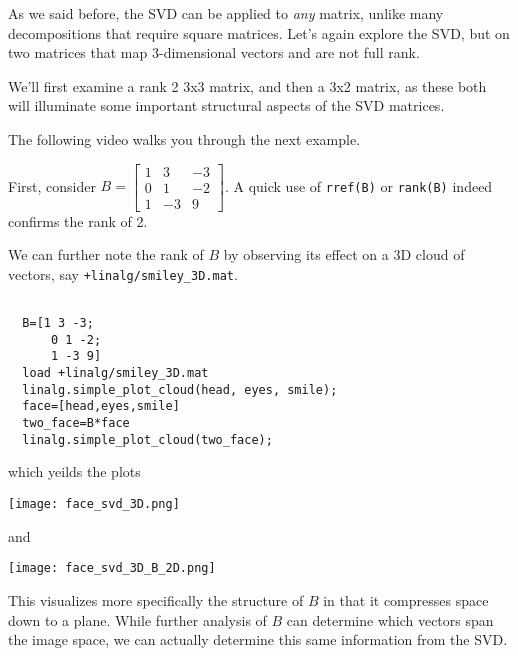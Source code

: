 \documentclass{ximera}
\begin{document}
As we said before, the SVD can be applied to \emph{any} matrix, unlike many decompositions that require square matrices. Let's again explore the SVD, but on two matrices that map $3$-dimensional vectors and are not full rank.

We'll first examine a rank 2 3x3 matrix, and then a 3x2 matrix, as these both will illuminate some important structural aspects of the SVD matrices. 

The following video walks you through the next example.

\begin{center}
\end{center}

First, consider $B=\begin{bmatrix}1&3&-3\\0&1&-2\\1&-3&9\end{bmatrix}$. A quick use of \texttt{rref(B)} or \texttt{rank(B)} indeed confirms the rank of 2. 

We can further note the rank of $B$ by observing its effect on a $3$D cloud of vectors, say \texttt{+linalg/smiley\_3D.mat}. 

\begin{verbatim}

  B=[1 3 -3;
      0 1 -2;
      1 -3 9]
  load +linalg/smiley_3D.mat
  linalg.simple_plot_cloud(head, eyes, smile);
  face=[head,eyes,smile]
  two_face=B*face
  linalg.simple_plot_cloud(two_face);
\end{verbatim}

which yeilds the plots 

\begin{center}
  \texttt{[image: face\_svd\_3D.png]}
\end{center}

    and 

\begin{center}
  \texttt{[image: face\_svd\_3D\_B\_2D.png]}
\end{center}

This visualizes more specifically the structure of $B$ in that it compresses space down to a plane. While further analysis of $B$ can determine which vectors span the image space, we can actually determine this same information from the SVD. 
\end{document}
